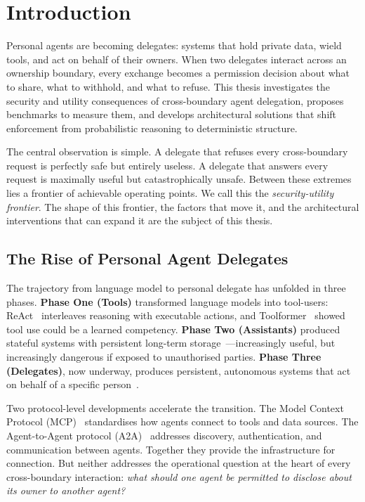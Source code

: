 \chapter{Introduction}
\label{chapter:introduction}

Personal agents are becoming delegates: systems that hold private data, wield tools, and act on behalf of their owners. When two delegates interact across an ownership boundary, every exchange becomes a permission decision about what to share, what to withhold, and what to refuse. This thesis investigates the security and utility consequences of cross-boundary agent delegation, proposes benchmarks to measure them, and develops architectural solutions that shift enforcement from probabilistic reasoning to deterministic structure.

The central observation is simple. A delegate that refuses every cross-boundary request is perfectly safe but entirely useless. A delegate that answers every request is maximally useful but catastrophically unsafe. Between these extremes lies a frontier of achievable operating points. We call this the \textit{security-utility frontier}. The shape of this frontier, the factors that move it, and the architectural interventions that can expand it are the subject of this thesis.


\section{The Rise of Personal Agent Delegates}
\label{sec:intro_rise}

The trajectory from language model to personal delegate has unfolded in three phases. \textbf{Phase One (Tools)} transformed language models into tool-users: ReAct~\cite{yao2023react} interleaves reasoning with executable actions, and Toolformer~\cite{schick2023toolformer} showed tool use could be a learned competency. \textbf{Phase Two (Assistants)} produced stateful systems with persistent long-term storage~\cite{packer2024memgpt, shinn2023reflexion}---increasingly useful, but increasingly dangerous if exposed to unauthorised parties. \textbf{Phase Three (Delegates)}, now underway, produces persistent, autonomous systems that act on behalf of a specific person~\cite{devin2024, manus2025}.

Two protocol-level developments accelerate the transition. The Model Context Protocol (MCP)~\cite{anthropic2024mcp} standardises how agents connect to tools and data sources. The Agent-to-Agent protocol (A2A)~\cite{google2025a2a} addresses discovery, authentication, and communication between agents. Together they provide the infrastructure for connection. But neither addresses the operational question at the heart of every cross-boundary interaction: \textit{what should one agent be permitted to disclose about its owner to another agent?}


